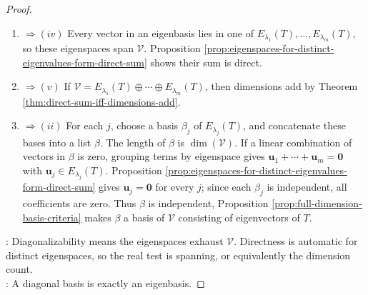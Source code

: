 \begin{theorem}
\begin{proof}
\begin{enumerate}[label=(\roman*).]
\item[$(ii)$]$\Rightarrow (iv)$ Every vector in an eigenbasis lies in one of $E_{\lambda_1}(T),\ldots,E_{\lambda_m}(T)$, so these eigenspaces span $\mathcal{V}$. Proposition \ref{prop:eigenspaces-for-distinct-eigenvalues-form-direct-sum} shows their sum is direct.
\item[$(iv)$]$\Rightarrow (v)$ If $\mathcal{V}=E_{\lambda_1}(T)\oplus\cdots\oplus E_{\lambda_m}(T)$, then dimensions add by Theorem \ref{thm:direct-sum-iff-dimensions-add}.
\item[$(v)$]$\Rightarrow (ii)$ For each $j$, choose a basis $\beta_j$ of $E_{\lambda_j}(T)$, and concatenate these bases into a list $\beta$. The length of $\beta$ is $\dim(\mathcal{V})$. If a linear combination of vectors in $\beta$ is zero, grouping terms by eigenspace gives $\mathbf{u}_1+\cdots+\mathbf{u}_m=\mathbf{0}$ with $\mathbf{u}_j\in E_{\lambda_j}(T)$. Proposition \ref{prop:eigenspaces-for-distinct-eigenvalues-form-direct-sum} gives $\mathbf{u}_j=\mathbf{0}$ for every $j$; since each $\beta_j$ is independent, all coefficients are zero. Thus $\beta$ is independent, Proposition \ref{prop:full-dimension-basis-criteria} makes $\beta$ a basis of $\mathcal{V}$ consisting of eigenvectors of $T$.
\end{enumerate}
: Diagonalizability means the eigenspaces exhaust $\mathcal{V}$. Directness is automatic for distinct eigenspaces, so the real test is spanning, or equivalently the dimension count.\\
: A diagonal basis is exactly an eigenbasis.
\end{proof}
\end{theorem}
